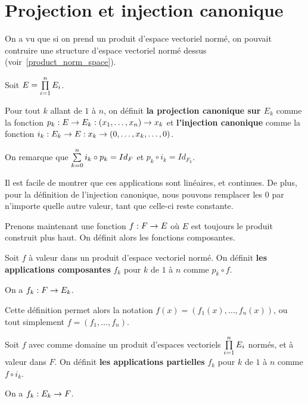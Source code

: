 \section{Projection et injection canonique}

On a vu que si on prend un produit d'espace vectoriel normé, on pouvait
contruire une structure d'espace vectoriel normé dessus (voir~\ref{product_norm_space}).


Soit $E =  \prod\limits_{i = 1}^{n} E_{i}$.
\begin{definition} 
\label{injection_projection_definition}
	Pour tout $k$ allant de $1$ à $n$, on définit \textbf{la projection
		canonique sur $E_{k}$} comme la fonction
		$p_{k} : E \rightarrow E_{k} : (x_{1}, \ldots, x_{n}) \rightarrow
		x_{k}$ et \textbf{l'injection canonique}
		comme la fonction $i_{k} : E_{k} \rightarrow E : x_{k}
		\rightarrow (0, \ldots, x_{k}, \ldots, 0)$.
\end{definition}

On remarque que $\sum\limits_{k = 0}^{n} i_{k} \circ p_{k} = Id_{F}$ et $p_{k} \circ
i_{k} = Id_{F_{k}}$.

Il est facile de montrer que ces applications sont linéaires, et continues.
De plus, pour la définition de l'injection canonique, nous pouvons remplacer les
$0$ par n'importe quelle autre valeur, tant que celle-ci reste constante.

Prenons maintenant une fonction $f : F \rightarrow E$ où $E$ est toujours
le produit construit plus haut.
On définit alors les fonctions composantes.

\begin{definition} 
\label{composante_function}
	Soit $f$ à valeur dans un produit d'espace vectoriel normé. On définit
	\textbf{les applications composantes} $f_{k}$ pour $k$ de $1$ à $n$ comme
	$p_{k} \circ f$.

	On a $f_{k} : F \rightarrow E_{k}$.
\end{definition}

Cette définition permet alors la notation $f(x) = (f_{1}(x), \ldots, f_{n}(x))$,
ou tout simplement $f = (f_{1}, \ldots, f_{n})$.

\begin{definition} 
\label{partial_application}
	Soit $f$ avec comme domaine un produit d'espaces vectoriels
	$\prod\limits_{i = 1}^{n} E_{i}$ normés, et à valeur dans $F$. On définit
	\textbf{les applications partielles} $f_{k}$ pour $k$ de $1$ à $n$ comme $f
	\circ i_{k}$.

	On a $f_{k} : E_{k} \rightarrow F$.
\end{definition}


